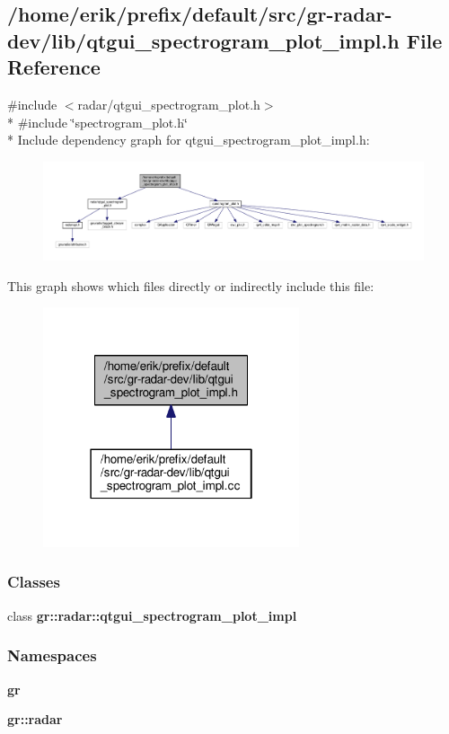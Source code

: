 \subsection{/home/erik/prefix/default/src/gr-\/radar-\/dev/lib/qtgui\+\_\+spectrogram\+\_\+plot\+\_\+impl.h File Reference}
\label{qtgui__spectrogram__plot__impl_8h}
{\ttfamily \#include $<$radar/qtgui\+\_\+spectrogram\+\_\+plot.\+h$>$}\\*
{\ttfamily \#include \char`\"{}spectrogram\+\_\+plot.\+h\char`\"{}}\\*
Include dependency graph for qtgui\+\_\+spectrogram\+\_\+plot\+\_\+impl.\+h\+:
\nopagebreak
\begin{figure}[H]
\begin{center}
\leavevmode
\includegraphics[width=350pt]{db/d4d/qtgui__spectrogram__plot__impl_8h__incl}
\end{center}
\end{figure}
This graph shows which files directly or indirectly include this file\+:
\nopagebreak
\begin{figure}[H]
\begin{center}
\leavevmode
\includegraphics[width=214pt]{dd/d3a/qtgui__spectrogram__plot__impl_8h__dep__incl}
\end{center}
\end{figure}
\subsubsection*{Classes}
\begin{DoxyCompactItemize}
\item 
class {\bf gr\+::radar\+::qtgui\+\_\+spectrogram\+\_\+plot\+\_\+impl}
\end{DoxyCompactItemize}
\subsubsection*{Namespaces}
\begin{DoxyCompactItemize}
\item 
 {\bf gr}
\item 
 {\bf gr\+::radar}
\end{DoxyCompactItemize}
